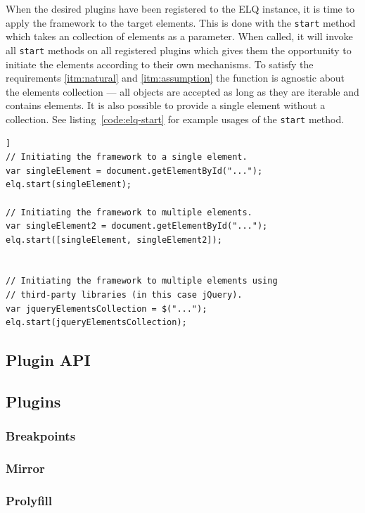 \documentclass[a4paper,11pt]{kth-mag}
\newcommand{\code}[1]{\texttt{#1}}
\newcommand\abbr[2][]{\uppercase{#2}\ifthenelse{\equal{#1}{}}%
                     {}{#1}}
\begin{document}
          When the desired plugins have been registered to the \abbr{elq} instance, it is time to apply the framework to the target elements.
          This is done with the \code{start} method which takes an collection of elements as a parameter.
          When called, it will invoke all \code{start} methods on all registered plugins which gives them the opportunity to initiate the elements according to their own mechanisms.
          To satisfy the requirements \ref{itm:natural} and \ref{itm:assumption} the function is agnostic about the elements collection --- all objects are accepted as long as they are iterable and contains elements.
          It is also possible to provide a single element without a collection.
          See listing~\ref{code:elq-start} for example usages of the \code{start} method.
          \begin{lstlisting}[caption={Example usages of the \code{start} method. The method only requires an iterable collection, so it is library agnostic.},captionpos=b,label={code:elq-start}]]
// Initiating the framework to a single element.
var singleElement = document.getElementById("...");
elq.start(singleElement);

// Initiating the framework to multiple elements.
var singleElement2 = document.getElementById("...");
elq.start([singleElement, singleElement2]);


// Initiating the framework to multiple elements using
// third-party libraries (in this case jQuery).
var jqueryElementsCollection = $("...");
elq.start(jqueryElementsCollection);
          \end{lstlisting}

        \subsection{Plugin \abbr{api}}
        \subsection{Plugins}
          \subsubsection{Breakpoints}
          \subsubsection{Mirror}
          \subsubsection{Prolyfill}
\end{document}
